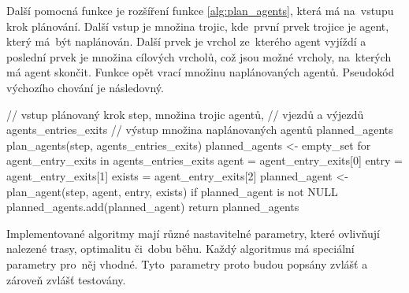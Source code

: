 Další pomocná funkce je rozšíření funkce \ref{alg:plan_agents}, která má na~vstupu krok plánování.
Další vstup je množina trojic, kde~první prvek trojice je agent, který má~být naplánován.
Další prvek je vrchol ze~kterého agent vyjíždí a
poslední prvek je množina cílových vrcholů, což jsou možné vrcholy, na~kterých má agent skončit.
Funkce opět vrací množinu naplánovaných agentů.
Pseudokód výchozího chování je následovný.
\begin{code}[xrightmargin=6em]
// vstup plánovaný krok step, množina trojic agentů,
// vjezdů a výjezdů agents_entries_exits
// výstup množina naplánovaných agentů planned_agents
plan_agents(step, agents_entries_exits)
planned_agents <- empty_set
for agent_entry_exits in agents_entries_exits
agent = agent_entry_exits[0]
entry = agent_entry_exits[1]
exists = agent_entry_exits[2]
planned_agent <- plan_agent(step, agent, entry, exists)
if planned_agent is not NULL
planned_agents.add(planned_agent)
return planned_agents
\end{code}

Implementované algoritmy mají různé nastavitelné parametry, které ovlivňují nalezené trasy, optimalitu či~dobu běhu.
Každý algoritmus má speciální parametry pro~něj vhodné.
Tyto~parametry proto budou popsány zvlášť a zároveň zvlášť testovány.








